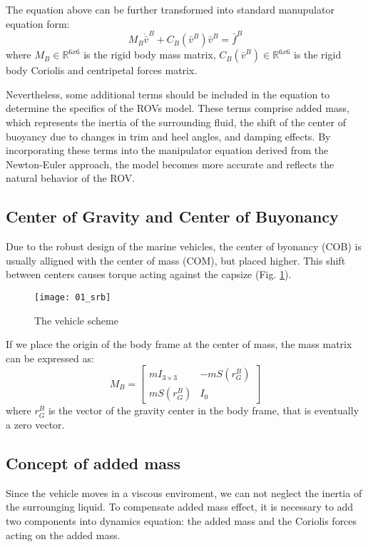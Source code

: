     The equation above can be further transformed  into standard manupulator equation form:
    $$
     M_B \dot{\bar{v}}^B+C_B(\bar{v}^B) \bar{v}^B
    = \bar{f}^B
    $$
    where
    $M_B \in \mathbb{R}^{6 x 6}$ is the rigid body mass matrix,
    $C_B(\bar{v}^B) \in \mathbb{R}^{6 x 6}$ is the rigid body Coriolis and centripetal forces matrix.

    Nevertheless, some additional terms should be included in the equation to determine the specifics of the ROVs model. 
    These terms comprise added mass, which represents the inertia of the surrounding fluid, the shift of the 
    center of buoyancy due to changes in trim and heel angles, and damping effects. 
    By incorporating these terms into the manipulator equation derived from the Newton-Euler approach, 
    the model becomes more accurate and reflects the natural behavior of the ROV.    

\subsection{Center of Gravity and Center of Buyonancy}
    
    Due to the robust design of the marine vehicles, the center of byonancy (COB) is usually alligned with
    the center of mass (COM), but placed higher.
    This shift between centers causes torque acting against the capsize (Fig. \ref{image:scheme}).
    \begin{figure}[H]
        \centering\texttt{[image: 01\_srb]}
        \caption{The vehicle scheme}
        \label{image:scheme}
    \end{figure}
    
    If we place the origin of the body frame at the center of mass, the mass matrix can be expressed as:
    $$
    M_B=\left[\begin{array}{cc}
        m I_{3 \times 3} & -m S\left(r_G^B\right) \\
        m S\left(r_G^B\right) & I_0
    \end{array}\right]
    $$
    where $r_G^B$ is the vector of the gravity center in the body frame, that is eventually a zero vector.

\subsection{Concept of added mass}

    Since the vehicle moves in a viscous enviroment, we can not neglect the inertia of the surrounging liquid.
    To compensate added mass effect, it is necessary to add two components into dynamics equation: 
    the added mass and the Coriolis forces acting on the added mass.

